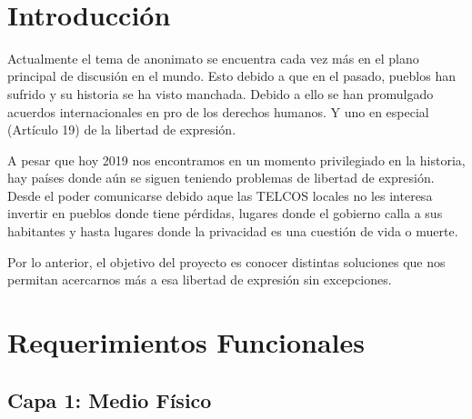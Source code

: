 \documentclass{article}
\begin{document}
\begin{adjustwidth}{8.8cm}{}
~\vfill

\section{Introducción}\label{introducciuxf3n}
\large
\begin{sloppypar}
Actualmente el tema de anonimato se encuentra cada vez más en el plano
principal de discusión en el mundo. Esto debido a que en el pasado,
pueblos han sufrido y su historia se ha visto manchada. Debido a ello se
han promulgado acuerdos internacionales en pro de los derechos humanos.
Y uno en especial (Artículo 19) de la libertad de expresión.

A pesar que hoy 2019 nos encontramos en un momento privilegiado en la
historia, hay países donde aún se siguen teniendo problemas de libertad
de expresión. Desde el poder comunicarse debido aque las TELCOS locales
no les interesa invertir en pueblos donde tiene pérdidas, lugares donde
el gobierno calla a sus habitantes y hasta lugares donde la privacidad
es una cuestión de vida o muerte.

Por lo anterior, el objetivo del proyecto es conocer distintas
soluciones que nos permitan acercarnos más a esa libertad de expresión
sin excepciones.
\end{sloppypar}

\vspace{2cm}

\end{adjustwidth}


\newcommand{\sectionbreak}{\clearpage}

\section{Requerimientos Funcionales}\label{requerimientos-funcionales}

\subsection{Capa 1: Medio Físico}\label{capa-1-medio-fuxedsico}
\end{document}
